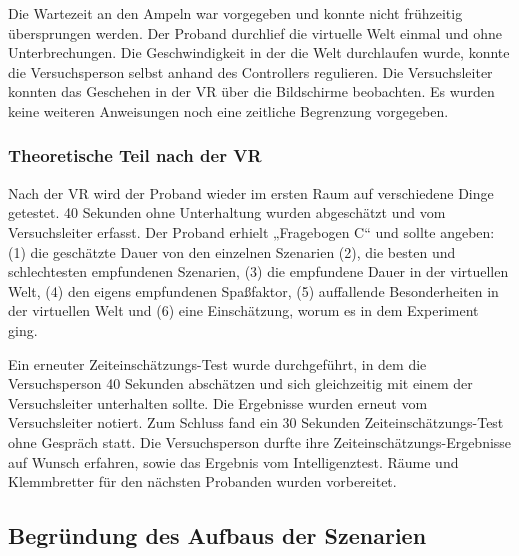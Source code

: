\documentclass{Paper}
\begin{document}
Die Wartezeit an den Ampeln war vorgegeben und konnte nicht frühzeitig übersprungen werden. Der Proband durchlief die virtuelle Welt einmal und ohne Unterbrechungen. Die Geschwindigkeit in der die Welt durchlaufen wurde, konnte die
Versuchsperson selbst anhand des Controllers regulieren. Die Versuchsleiter konnten das
Geschehen in der VR über die Bildschirme beobachten. Es wurden
keine weiteren Anweisungen noch eine zeitliche Begrenzung vorgegeben. 


\subsubsection{Theoretische Teil nach der VR}
Nach der VR wird der Proband wieder im ersten Raum auf verschiedene Dinge getestet.
40 Sekunden ohne
Unterhaltung wurden abgeschätzt und vom Versuchsleiter erfasst. Der Proband erhielt
„Fragebogen C“ und sollte angeben: (1) die geschätzte Dauer von den einzelnen Szenarien
(2), die besten und schlechtesten empfundenen Szenarien, (3) die empfundene Dauer in
der virtuellen Welt, (4) den eigens empfundenen Spaßfaktor, (5) auffallende
Besonderheiten in der virtuellen Welt und (6) eine Einschätzung, worum es in dem
Experiment ging.
\par
Ein erneuter Zeiteinschätzungs-Test wurde durchgeführt, in dem die
Versuchsperson 40 Sekunden abschätzen und sich gleichzeitig mit einem der Versuchsleiter
unterhalten sollte. Die Ergebnisse wurden erneut vom Versuchsleiter notiert. Zum Schluss fand ein 30
Sekunden Zeiteinschätzungs-Test ohne Gespräch statt. 
Die Versuchsperson durfte ihre Zeiteinschätzungs-Ergebnisse auf Wunsch erfahren, sowie das Ergebnis vom
Intelligenztest. Räume und Klemmbretter für den nächsten Probanden wurden vorbereitet.
\par
	\subsection{Begründung des Aufbaus der Szenarien}
\end{document}
